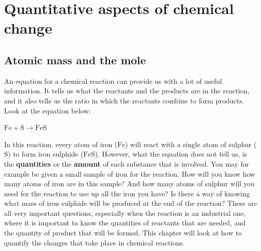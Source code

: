          \chapter{Quantitative aspects of chemical change}\label{chap:quanchem}
    \setcounter{figure}{1}
    \setcounter{subfigure}{1}
    \label{0044f0dab6cfd2ca2bac282dc4009886}
         \section{Atomic mass and the mole}
    \nopagebreak
      \label{m38717*id275167}An equation for a chemical reaction can provide us with a lot of useful information. It tells us what the reactants and the products are in the reaction, and it also tells us the ratio in which the reactants combine to form products. Look at the equation below:\par 
      \label{m38717*id275172}
        $\text{Fe}+\text{S}\to \text{FeS}$
      \par 
      \label{m38717*id275542}In this reaction, every atom of iron ($\text{Fe}$) will react with a single atom of sulphur ($\text{S}$) to form iron sulphide ($\text{FeS}$). However, what the equation does not tell us, is the \textbf{quantities} or the \textbf{amount} of each substance that is involved. You may for example be given a small sample of iron for the reaction. How will you know how many atoms of iron are in this sample? And how many atoms of sulphur will you need for the reaction to use up all the iron you have? Is there a way of knowing what mass of iron sulphide will be produced at the end of the reaction? These are all very important questions, especially when the reaction is an industrial one, where it is important to know the quantities of reactants that are needed, and the quantity of product that will be formed. This chapter will look at how to quantify the changes that take place in chemical reactions.\par 
{}
    \label{m38717*cid2}
